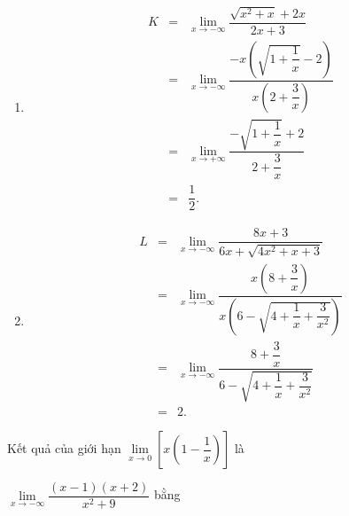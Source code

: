\begin{ex}
{\begin{enumerate}
\begin{eqnarray*}
				&=&\displaystyle\lim_{x\to +\infty} \dfrac{x\left( \sqrt{1+\dfrac{1}{x}}+2\right)}{x\left(2+\dfrac{3}{x}\right)}  \\
				&=&\displaystyle\lim_{x\to +\infty} \dfrac{ \sqrt{1+\dfrac{1}{x}}+2}{2+\dfrac{3}{x}}  \\
				 &=& \dfrac{3}{2}.
			\end{eqnarray*}
			\item 
			\begin{eqnarray*}
				K &=& \displaystyle\lim_{x\to -\infty} \dfrac{\sqrt{x^2+x}+2x}{2x+3}\\ 
				&=&\displaystyle\lim_{x\to -\infty} \dfrac{-x\left( \sqrt{1+\dfrac{1}{x}}-2\right)}{x\left(2+\dfrac{3}{x}\right)} \\ 
				&=&\displaystyle\lim_{x\to +\infty} \dfrac{ -\sqrt{1+\dfrac{1}{x}}+2}{2+\dfrac{3}{x}}  \\
				 &=& \dfrac{1}{2}.
			\end{eqnarray*}
			\item 
			\begin{eqnarray*}
				L  &=& \displaystyle\lim_{x\to -\infty} \dfrac{8x+3}{6x+\sqrt{4x^2+x+3}}\\
				&=&\displaystyle\lim_{x\to -\infty}  \dfrac{x\left(8+\dfrac{3}{x}\right)}{x\left(6- \sqrt{4+\dfrac{1}{x}+\dfrac{3}{x^2}}\right)} \\
				 &=&\displaystyle\lim_{x\to -\infty} \dfrac{8+\dfrac{3}{x}}{6- \sqrt{4+\dfrac{1}{x}+\dfrac{3}{x^2}}} \\
				&=&  2.
			\end{eqnarray*}
		\end{enumerate}
	 }
\end{ex}

\begin{ex}%
	Kết quả của  giới hạn $\lim\limits_{x\to 0}\left[x\left(1-\dfrac{1}{x}\right)\right]$ là
\end{ex}

\begin{ex}%
	 $\lim\limits_{x\to -\infty}\dfrac{\left(x-1\right)\left(x+2\right)}{x^2+9}$ bằng
\end{ex}

